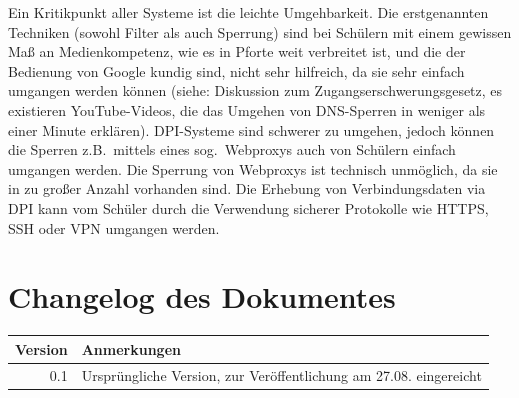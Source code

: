 \documentclass[10pt,a4paper,notitlepage]{scrartcl}
\begin{document}
\begin{multicols}{2}
Ein Kritikpunkt aller Systeme ist die leichte Umgehbarkeit. Die erstgenannten Techniken (sowohl Filter als auch Sperrung) sind bei Schülern mit einem gewissen Maß an Medienkompetenz, wie es in Pforte weit verbreitet ist, und die der Bedienung von Google kundig sind, nicht sehr hilfreich, da sie sehr einfach umgangen werden können (siehe: Diskussion zum \glqq Zugangserschwerungsgesetz\grqq, es existieren YouTube-Videos, die das Umgehen von DNS-Sperren in weniger als einer Minute erklären).
DPI-Systeme sind schwerer zu umgehen, jedoch können die Sperren z.B.\ mittels eines sog.\ Webproxys auch von Schülern einfach umgangen werden. Die Sperrung von Webproxys ist technisch unmöglich, da sie in zu großer Anzahl vorhanden sind. Die Erhebung von Verbindungsdaten via DPI kann vom Schüler durch die Verwendung sicherer Protokolle wie HTTPS, SSH oder VPN umgangen werden.
\end{multicols}
\newpage
\section*{Changelog des Dokumentes}
\begin{tabularx}{\textwidth}{r|l}
\textbf{Version}&\textbf{Anmerkungen}\\\hline
0.1&Ursprüngliche Version, zur Veröffentlichung am 27.08. eingereicht
\end{tabularx}
\end{document}
